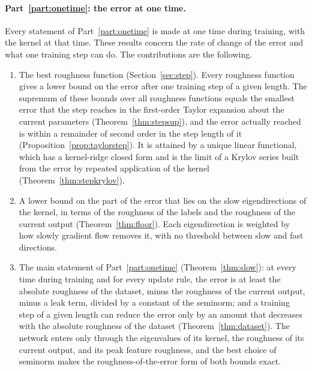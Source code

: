 \documentclass[11pt]{article}
\theoremstyle{definition}
\theoremstyle{remark}
\begin{document}
\paragraph{Part~\ref{part:onetime}: the error at one time.}
Every statement of Part~\ref{part:onetime} is made at one time during training, with the kernel at that time.
These results concern the rate of change of the error and what one training step can do.
The contributions are the following.
\begin{enumerate}[label=(\arabic*)]
\item The best roughness function (Section~\ref{sec:step}).
Every roughness function gives a lower bound on the error after one training step of a given length.
The supremum of these bounds over all roughness functions equals the smallest error that the step reaches in the first-order Taylor expansion about the current parameters (Theorem~\ref{thm:stepsup}), and the error actually reached is within a remainder of second order in the step length of it (Proposition~\ref{prop:taylorstep}).
It is attained by a unique linear functional, which has a kernel-ridge closed form and is the limit of a Krylov series built from the error by repeated application of the kernel (Theorem~\ref{thm:stepkrylov}).
\item A lower bound on the part of the error that lies on the slow eigendirections of the kernel, in terms of the roughness of the labels and the roughness of the current output (Theorem~\ref{thm:floor}).
Each eigendirection is weighted by how slowly gradient flow removes it, with no threshold between slow and fast directions.
\item The main statement of Part~\ref{part:onetime} (Theorem~\ref{thm:slow}): at every time during training and for every update rule, the error is at least the absolute roughness of the dataset, minus the roughness of the current output, minus a leak term, divided by a constant of the seminorm; and a training step of a given length can reduce the error only by an amount that decreases with the absolute roughness of the dataset (Theorem~\ref{thm:dataset}).
The network enters only through the eigenvalues of its kernel, the roughness of its current output, and its peak feature roughness, and the best choice of seminorm makes the roughness-of-the-error form of both bounds exact.
\end{enumerate}
\end{document}
